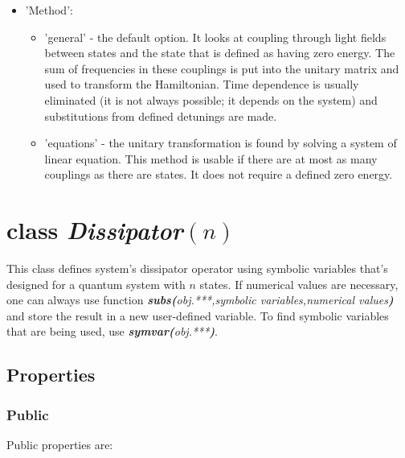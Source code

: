 \documentclass{article}
\numberwithin{equation}{section}
\numberwithin{figure}{section}
\numberwithin{table}{section}
\newcommand\codefun[2]{\textit{\textbf{#1(}#2\textbf{)}}}
\newcommand\codeclass[1]{\ttfamily\textbf{\textit{#1}}\rmfamily}
\begin{document}
\begin{itemize}
\begin{itemize}

\item 'Method':

\begin{itemize}
\item 'general' - the default option. It looks at coupling through light fields between states and the state that is defined as having zero energy. The sum of frequencies in these couplings is put into the unitary matrix and used to transform the Hamiltonian. Time dependence is usually eliminated (it is not always possible; it depends on the system) and substitutions from defined detunings are made.
\item 'equations' - the unitary transformation is found by solving a system of linear equation. This method is usable if there are at most as many couplings as there are states. It does not require a defined zero energy. 
\end{itemize}
\end{itemize}

\end{itemize}


\section*{\textbf{class} \codeclass{Dissipator}$(n)$}

This class defines system's dissipator operator using symbolic variables that's designed for a quantum system with $n$ states. If numerical values are necessary, one can always use function \codefun{subs}{obj.***,symbolic variables,numerical values} and store the result in a new user-defined variable. To find symbolic variables that are being used, use \codefun{symvar}{obj.***}.

\subsection*{Properties}

\subsubsection*{Public}

Public properties are:
\end{document}
